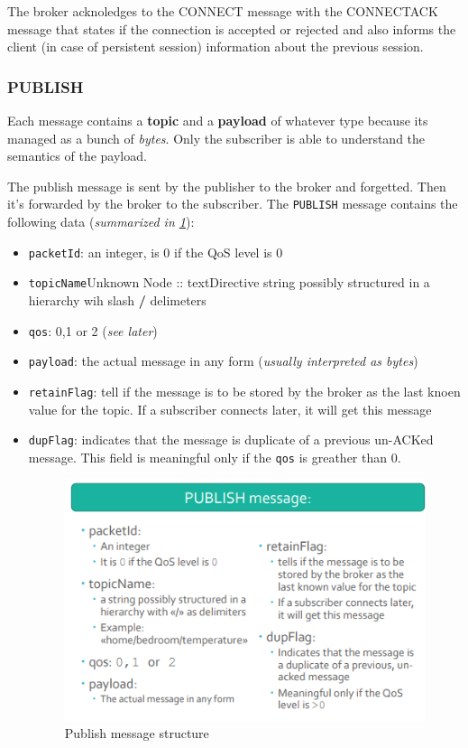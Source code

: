 \documentclass[10pt,a4paper]{report}
\theoremstyle{definition}
\begin{document}
The broker acknoledges to the CONNECT message with the CONNECTACK message that states if the connection is accepted or rejected and also informs the client (in case of persistent session) information about the previous session.
\subsubsection{PUBLISH}\label{sec:publish}
Each message contains a \textbf{topic} and a \textbf{payload} of whatever type because its managed as a bunch of \textit{bytes}. Only the subscriber is able to understand the semantics of the payload.

The publish message is sent by the publisher to the broker and forgetted. Then it's forwarded by the broker to the subscriber.
The \texttt{PUBLISH} message contains the following data (\textit{summarized in \ref{mqtt-publish}}):
\begin{itemize}
	\item 
	\texttt{packetId}: an integer, is 0 if the QoS level is 0
	\item 
	\texttt{topicName}Unknown Node :: textDirective
	string possibly structured in a hierarchy wih slash \textbf{/} delimeters
	\item 
	\texttt{qos}: 0,1 or 2 (\textit{see later})
	\item 
	\texttt{payload}: the actual message in any form (\textit{usually interpreted as bytes})
	\item 
	\texttt{retainFlag}: tell if the message is to be stored by the broker as the last knoen value for the topic. If a subscriber connects later, it will get this message
	\item 
	\texttt{dupFlag}: indicates that the message is duplicate of a previous un-ACKed message. This field is meaningful only if the \texttt{qos} is greather than 0.
	\begin{figure}[h]
		\centering\includegraphics[scale=0.50]{images/Pasted image 20230303165056.png}
		\caption{Publish message structure}\label{mqtt-publish}\end{figure}
	

\end{itemize}
\end{document}

